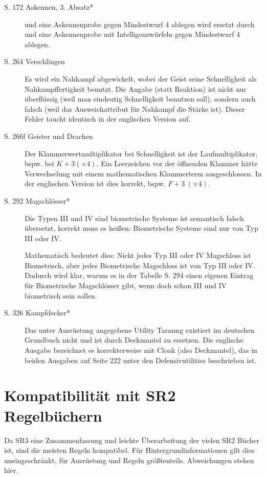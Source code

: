 \documentclass[a4paper]{scrartcl}
\newcommand{\ditoengl}{Dieser Fehler taucht identisch in der englischen Version auf. }
\begin{document}
\begin{description}
 \item[S. 172 Askennen, 3. Absatz*] \glqq und eine Askennenprobe gegen Mindestwurf 4 ablegen\grqq{} wird ersetzt durch \glqq und eine Askennenprobe mit Intelligenzwürfeln gegen Mindestwurf 4 ablegen\grqq.

 \item[S. 264 Verschlingen]
Es wird ein Nahkampf abgewickelt, wobei der Geist seine Schnelligkeit als Nahkampffertigkeit benutzt.
Die Angabe \glqq(statt Reaktion)\grqq{} ist nicht nur überflüssig (weil man eindeutig Schnelligkeit benutzen soll), sondern auch falsch (weil das Ausweichattribut für Nahkampf die Stärke ist). \ditoengl

 \item[S. 266f Geister und Drachen]
Der Klammerwertmultiplikator bei Schnelligkeit ist der Laufmultiplikator, bspw. bei $K+3(\times4)$. Ein Leerzeichen vor der öffnenden Klammer hätte Verwechselung mit einem mathematischen Klammerterm ausgeschlossen. In der englischen Version ist dies korrekt, bspw. $F+3\ (\times4)$.

 \item[S. 292 Magschlösser*]
\glqq Die Typen III und IV sind biometrische Systeme\grqq{} ist semantisch falsch übersetzt, korrekt muss es heißen: \glqq Biometrische Systeme sind nur von Typ III oder IV\grqq.

Mathematisch bedeutet dies: Nicht jedes Typ III oder IV Magschloss ist Biometrisch, aber jedes Biometrische Magschloss ist von Typ III oder IV.
Dadurch wird klar, warum es in der Tabelle S. 294 einen eigenen Eintrag für Biometrische Magschlösser gibt, wenn doch schon III und IV biometrisch sein sollen.

 \item[S. 326 Kampfdecker*]
Das unter Ausrüstung angegebene Utility \glqq Tarnung\grqq{} existiert im deutschen Grundbuch nicht und ist durch \glqq Deckmantel\grqq{} zu ersetzen. Die englische Ausgabe bezeichnet es korrekterweise mit Cloak (also Deckmantel), das in beiden Ausgaben auf Seite 222 unter den Defensivutilities beschrieben ist.
\end{description}

\section{Kompatibilität mit SR2 Regelbüchern}
Da SR3 eine Zusammenfassung und leichte Überarbeitung der vielen SR2 Bücher ist, sind die meisten Regeln kompatibel. Für Hintergrundinformationen gilt dies uneingeschränkt, für Ausrüstung und Regeln größtenteils.
Abweichungen stehen hier.
\end{document}
